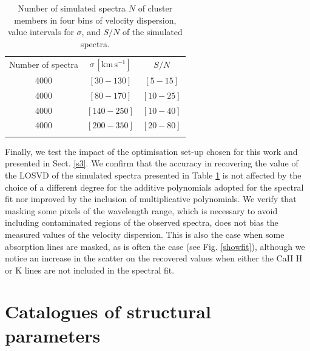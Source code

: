 \documentclass{aa}
\begin{document}
\begin{appendix}
\begin{table}
\caption{Number of simulated spectra $N$ of cluster members in four bins of velocity dispersion,  value intervals for $\sigma$, and $S/N$ of the simulated spectra.}             %
\centering                          %
\begin{tabular}{c c c}        %
\hline \noalign{\smallskip}                %
Number of spectra & $\sigma\,[\mathrm{km \, s^{-1}}]$ & $S/N$ \\    %
\noalign{\smallskip} \hline  \noalign{\smallskip}                      %
            4000 & $[30-130]$ & $[5-15]$  \\
            \rule{0pt}{2.5ex}
            4000 & $[80-170]$ & $[10-25]$\\
            \rule{0pt}{2.5ex}
            4000 & $[140-250]$ & $[10-40]$     \\
            \rule{0pt}{2.5ex}
            4000 & $[200-350]$ & $[20-80]$    \\
 \noalign{\smallskip} \hline                                   %
\end{tabular}\label{simpar}
\end{table}


Finally, we test the impact of the optimisation set-up chosen for this work and presented in Sect. \ref{s3}. We confirm that the accuracy in recovering the value of the LOSVD of the simulated spectra presented in Table \ref{simpar} is not affected by the choice of a different degree for the additive polynomials adopted for the spectral fit nor improved by the inclusion of multiplicative polynomials. We verify that masking some pixels of the wavelength range, which is necessary to avoid including contaminated regions of the observed spectra, does not bias the measured values of the velocity dispersion. This is also the case when some absorption lines are masked, as is often the case (see Fig. \ref{showfit}), although we notice an increase in the scatter on the recovered values when either the CaII H or K lines are not included in the spectral fit.


\section{Catalogues of structural parameters}
\label{appendix:cat_description}


\end{appendix}
\end{document}
